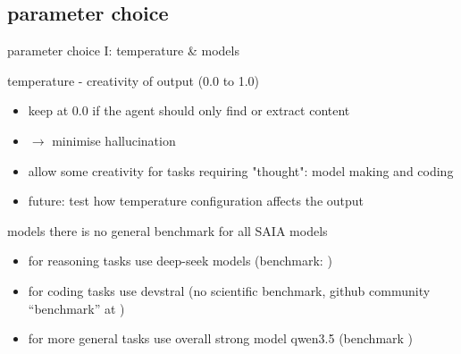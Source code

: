 \documentclass[t,
10pt,
handout, %
]{beamer}
\numberwithin{equation}{section}
\begin{document}
	\subsection{parameter choice}
	
	\begin{frame}[c]{parameter choice I: temperature \& models}
		\begin{block}{temperature - creativity of output (0.0 to 1.0)}
			\begin{itemize}
				\item keep at 0.0 if the agent should only find or extract content
				\item{$\rightarrow$} minimise hallucination
				\item allow some creativity for tasks requiring "thought": model making and coding
				\item {\color{blue}future}: test how temperature configuration affects the output 
			\end{itemize}
		\end{block}
		\pause
		\begin{block}{models}
			there is no general benchmark for all SAIA models
			\begin{itemize}
				\item for reasoning tasks use deep-seek models (benchmark: \autocite{deepSeek})
				\item for coding tasks use devstral (no scientific benchmark, github community \enquote{benchmark} at \autocite{huggFace})
				\item for more general tasks use overall strong model qwen3.5 (benchmark \autocite{qwenteam2026})
			\end{itemize}
		\end{block}
	\end{frame}
	
\end{document}
